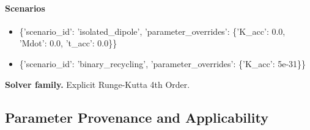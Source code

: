 \documentclass[11pt]{article}
\begin{document}
\paragraph{Scenarios}
\begin{itemize}
\item \{'scenario\_id': 'isolated\_dipole', 'parameter\_overrides': \{'K\_acc': 0.0, 'Mdot': 0.0, 't\_acc': 0.0\}\}
\item \{'scenario\_id': 'binary\_recycling', 'parameter\_overrides': \{'K\_acc': 5e-31\}\}
\end{itemize}

\noindent\textbf{Solver family.} Explicit Runge-Kutta 4th Order.

\subsection{Parameter Provenance and Applicability}
\end{document}

